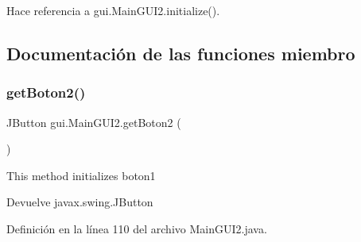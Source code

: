 Hace referencia a gui.\+Main\+G\+U\+I2.\+initialize().



\subsection{Documentación de las funciones miembro}
\mbox{\label{classgui_1_1MainGUI2_a8d6f23df0a0e9a0ff30ee52cd96a22b5}} 
\subsubsection{\texorpdfstring{getBoton2()}{getBoton2()}}
{\footnotesize\ttfamily J\+Button gui.\+Main\+G\+U\+I2.\+get\+Boton2 (\begin{DoxyParamCaption}{ }\end{DoxyParamCaption})\hspace{0.3cm}{\ttfamily [private]}}

This method initializes boton1

\begin{DoxyReturn}{Devuelve}
javax.\+swing.\+J\+Button 
\end{DoxyReturn}


Definición en la línea 110 del archivo Main\+G\+U\+I2.\+java.



